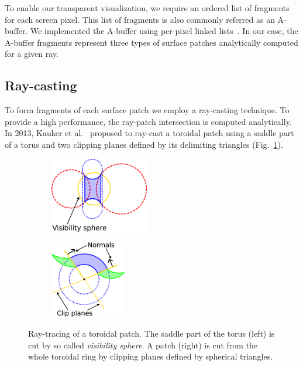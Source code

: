 \label{sec:vis}

To enable our transparent visualization, we require an ordered list of fragments for each screen pixel. This list of fragments is also commonly referred as an A-buffer. We implemented the A-buffer using per-pixel linked lists~\cite{yang2010real}. In our case, the A-buffer fragments represent three types of surface patches analytically computed for a given ray.

\subsection{Ray-casting}
\label{sec:spherical-patches}
To form fragments of each surface patch we employ a ray-casting technique. To provide a high performance, the ray-patch intersection is computed analytically.
In 2013, Kauker et al.~\cite{kauker2013rendering} proposed to ray-cast a toroidal patch using a saddle part of a torus and two clipping planes defined by its delimiting triangles (Fig.~\ref{fig:torus}).
\begin{figure}[htp]
  \centering
  \begin{subfigure}[t]{0.55\columnwidth}
    \centering
    \includegraphics[width=1.7in]{image/torus-vs.png}
  \end{subfigure}%
  \quad
  \begin{subfigure}[t]{0.4\columnwidth}
    \centering
    \includegraphics[width=1.3in]{image/torus-planes.png}
  \end{subfigure}
	\caption{Ray-tracing of a toroidal patch. The saddle part of the torus (left) is cut by so called \textit{visibility sphere}.
A patch (right) is cut from the whole toroidal ring by clipping planes defined by spherical triangles.}
	\label{fig:torus}
\end{figure}

